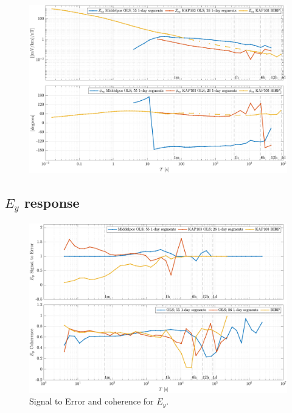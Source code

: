 \documentclass{article}
\begin{document}
\clearpage

\begin{figure}[h!]
\centering
\includegraphics[width=\textwidth]{figures/KAP103_Middelpos/transferfnZ_compare-Z_xy_Magnitude_Phase.pdf}
\caption{}
\label{fig:universe}
\end{figure}

\clearpage

\subsection{$E_y$ response}

\begin{figure}[h!]
\centering
\includegraphics[width=\textwidth]{figures/KAP103_Middelpos/SN_compare-E_y.pdf}
\caption{Signal to Error and coherence for $E_y$.}
\label{fig:universe}
\end{figure}
\end{document}
